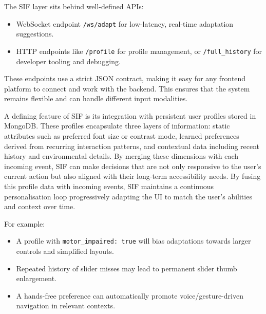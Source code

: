 The SIF layer sits behind well-defined APIs:
\begin{itemize}
    \item WebSocket endpoint \texttt{/ws/adapt} for low-latency, real-time adaptation suggestions.
    \item HTTP endpoints like \texttt{/profile} for profile management, or \texttt{/full\_history} for developer tooling and debugging.
\end{itemize}
These endpoints use a strict JSON contract, making it easy for any frontend platform to connect and work with the backend. This ensures that the system remains flexible and can handle different input modalities.

A defining feature of SIF is its integration with persistent user profiles stored in MongoDB. These profiles encapsulate three layers of information: static attributes such as preferred font size or contrast mode, learned preferences derived from recurring interaction patterns, and contextual data including recent history and environmental details. By merging these dimensions with each incoming event, SIF can make decisions that are not only responsive to the user’s current action but also aligned with their long-term accessibility needs.
By fusing this profile data with incoming events, SIF maintains a continuous personalisation loop progressively adapting the UI to match the user’s abilities and context over time.

For example:
\begin{itemize}
    \item A profile with \texttt{motor\_impaired: true} will bias adaptations towards larger controls and simplified layouts.
    \item Repeated history of slider misses may lead to permanent slider thumb enlargement.
    \item A hands-free preference can automatically promote voice/gesture-driven navigation in relevant contexts.
\end{itemize}

